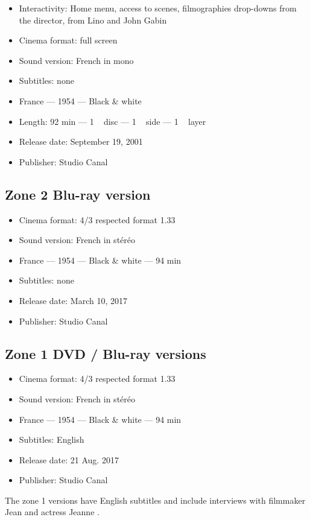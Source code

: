 \begin{itemize}\itemsep=0pt
    \item Interactivity: Home menu, access to scenes, filmographies drop-downs from the director, from Lino  and John \familyname Gabin{}
    \item Cinema format: full screen
    \item Sound version: French in mono
    \item Subtitles: none
    \item France --- 1954 --- Black \& white
    \item Length: 92 min --- 1 ~ disc --- 1 ~ side --- 1 ~ layer
    \item Release date: September 19, 2001
    \item Publisher: Studio Canal
\end{itemize}

\subsection*{Zone 2 Blu-ray version}

\begin{itemize}\itemsep=0pt
	\item Cinema format: 4/3 respected format 1.33
	\item Sound version: French in stéréo
	\item France --- 1954 --- Black \& white --- 94 min
	\item Subtitles: none
	\item Release date: March 10, 2017
	\item Publisher: Studio Canal
\end{itemize}

\subsection*{Zone 1 DVD / Blu-ray versions}

\begin{itemize}\itemsep=0pt
	\item Cinema format: 4/3 respected format 1.33
	\item Sound version: French in stéréo
	\item France --- 1954 --- Black \& white --- 94 min
	\item Subtitles: English
	\item Release date: 21 Aug. 2017
	\item Publisher: Studio Canal
\end{itemize}

The zone 1 versions have English subtitles and include interviews with filmmaker Jean  and actress Jeanne .

